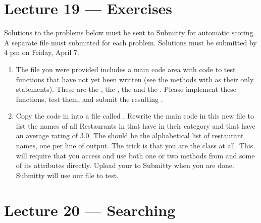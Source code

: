 \documentclass[letterpaper,10pt,english]{sphinxmanual}
\begin{document}
\chapter{Lecture 19 — Exercises}
\label{\detokenize{lecture_notes/lec19_classes2_exercises/exercises:lecture-19-exercises}}\label{\detokenize{lecture_notes/lec19_classes2_exercises/exercises::doc}}
Solutions to the problems below must be sent to Submitty for
automatic scoring.  A separate file must submitted for each problem.
Solutions must be submitted by 4 pm on Friday, April 7.
\begin{enumerate}
\item {} 
The  file you were provided includes a main code
area with code to test functions that have not yet been written
(see the methods with  as their only statements). These
are the , the , the  and
the .  Please implement these functions, test them, and
submit the resulting .

\item {} 
Copy the code in  into a file
called .  Rewrite the main code in
this new file to list the names of all Restaurants in
 that have  in their category and that have an average
rating of  3.0.  The  should be the alphabetical
list of restaurant names, one per line of
output.  The trick is that you are  the
 class at all.  This will require that you
access and use both one or two methods from  and some
of its attributes directly.  Upload your
 to Submitty when you are done.
Submitty will use our  file to test.

\end{enumerate}


\chapter{Lecture 20 — Searching}
\label{\detokenize{lecture_notes/lec20_searching:lecture-20-searching}}\label{\detokenize{lecture_notes/lec20_searching::doc}}
\end{document}
